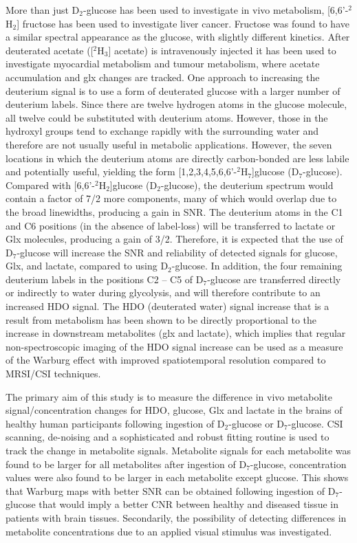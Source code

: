 \documentclass[class=article, crop=false]{standalone}
\begin{document}
More than just D$_2$-glucose has been used to investigate in vivo metabolism, [6,6'-$^2$H$_2$] fructose has been used to investigate liver cancer\cite{Zhang202366-2H2Cancer}. Fructose was found to have a similar spectral appearance as the glucose, with slightly different kinetics. After deuterated acetate ([$^2$H$_3$] acetate) is intravenously injected it has been used to investigate myocardial metabolism\cite{Wang2021NoninvasiveImaging} and tumour metabolism\cite{DeFeyter2018DeuteriumVivo}, where acetate accumulation and glx changes are tracked. One approach to increasing the deuterium signal is to use a form of deuterated glucose with a larger number of deuterium labels. Since there are twelve hydrogen atoms in the glucose molecule, all twelve could be substituted with deuterium atoms. However, those in the hydroxyl groups tend to exchange rapidly with the surrounding water and therefore are not usually useful in metabolic applications. However, the seven locations in which the deuterium atoms are directly carbon-bonded are less labile and potentially useful, yielding the form [1,2,3,4,5,6,6'-$^2$H$_7$]glucose (D$_7$-glucose). Compared with [6,6'-$^2$H$_2$]glucose (D$_2$-glucose), the deuterium spectrum would contain a factor of 7/2 more components, many of which would overlap due to the broad linewidths, producing a gain in SNR. The deuterium atoms in the C1 and C6 positions (in the absence of label-loss) will be transferred to lactate or Glx molecules\cite{DeFeyter2020DeuteriumBrain}, producing a gain of 3/2. Therefore, it is expected that the use of D$_7$-glucose will increase the SNR and reliability of detected signals for glucose, Glx, and lactate, compared to using D$_2$-glucose. In addition, the four remaining deuterium labels in the positions C2 – C5 of D$_7$-glucose are transferred directly or indirectly to water during glycolysis, and will therefore contribute to an increased HDO signal\cite{Mahar2020HDOMetabolism, Mahar2021DeuteratedGlucose}. The HDO (deuterated water) signal increase that is a result from metabolism has been shown to be directly proportional to the increase in downstream metabolites (glx and lactate)\cite{Mahar2021DeuteratedGlucose}, which implies that regular non-spectroscopic imaging of the HDO signal increase can be used as a measure of the Warburg effect with improved spatiotemporal resolution compared to MRSI/CSI techniques. 

The primary aim of this study is to measure the difference in vivo metabolite signal/concentration changes for HDO, glucose, Glx and lactate in the brains of healthy human participants following ingestion of D$_2$-glucose or D$_7$-glucose. CSI scanning, de-noising and a sophisticated and robust fitting routine is used to track the change in metabolite signals. Metabolite signals for each metabolite was found to be larger for all metabolites after ingestion of D$_7$-glucose, concentration values were also found to be larger in each metabolite except glucose. This shows that Warburg maps with better SNR can be obtained following ingestion of D$_7$-glucose that would imply a better CNR between healthy and diseased tissue in patients with brain tissues. Secondarily, the possibility of detecting differences in metabolite concentrations due to an applied visual stimulus was investigated.  
\end{document}
